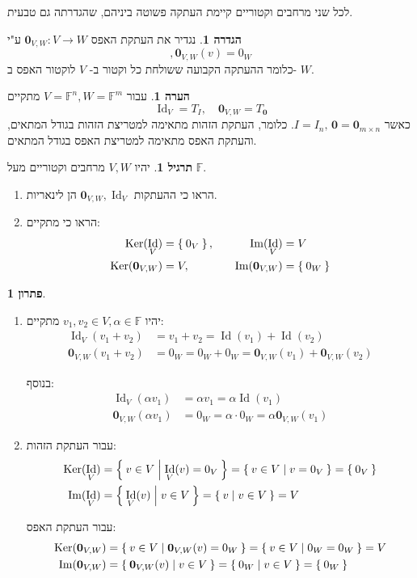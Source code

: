\documentclass[12pt]{report}
\theoremstyle{plain}
\theoremstyle{definition}
\newtheorem{definition}[theorem]{הגדרה}
\newtheorem{exercise}{תרגיל}[chapter]
\newtheorem{remark}{הערה}[chapter]
\newtheorem*{solution}{פתרון}
\newcommand{\F}{\mathbb{F}}
\newcommand{\0}{\mathbf{0}}
\DeclareMathOperator{\Ker}{Ker}
\DeclareMathOperator{\Image}{Im}
\DeclareMathOperator{\Id}{Id}
\begin{document}
לכל שני מרחבים וקטוריים קיימת העתקה פשוטה ביניהם, שהגדרתה גם טבעית.

\begin{definition}
\adddeftolist{העתקת האפס $\0_{V,W}$}
נגדיר את העתקת האפס
$\0_{V,W}:V\to W$
ע"י
$$
,\0_{V,W}(v)=0_W 
$$
כלומר ההעתקה הקבועה ששולחת כל וקטור ב-
$V$
לוקטור האפס ב-
$W$.
\end{definition}

\begin{remark}
עבור
$V=\F^n, W=\F^m$
מתקיים
$$
\Id_V=T_{I},\quad \0_{V,W}=T_{\0}
$$
כאשר
$I=I_n,\,\0=\0_{m\times n}$.
כלומר, העתקת הזהות מתאימה למטריצת הזהות בגודל המתאים, והעתקת האפס מתאימה למטריצת האפס בגודל המתאים.
\end{remark}

\begin{exercise}
יהיו
$V,W$
מרחבים וקטוריים מעל
$\F$.
\begin{enumerate}[label=\alph*.]
\item
הראו כי ההעתקות
$\0_{V,W},\Id_V$
הן לינאריות. 


\item
הראו כי מתקיים:
$$
\begin{aligned}
\Ker(\Id_V)      &= \Set{0_V},      & \quad \Image(\Id_V)      &= V \\
\Ker(\0_{V,W})   &= V,            & \quad \Image(\0_{V,W})   &= \Set{0_W}
\end{aligned}
$$
\end{enumerate}
\end{exercise}

\begin{solution}\
\begin{enumerate}[label=\alph*.]
\item 
יהיו 
$v_1,v_2\in V,\alpha\in\F$
מתקיים:
$$
\begin{aligned}
\Id_V(v_1+v_2)&=v_1+v_2=\Id(v_1)+\Id(v_2) \\
\0_{V,W}(v_1+v_2)&=0_W=0_W+0_W=\0_{V,W}(v_1)+\0_{V,W}(v_2)
\end{aligned}
$$

בנוסף:
$$
\begin{aligned}
\Id_V(\alpha v_1)&=\alpha v_1=\alpha\Id(v_1) \\
\0_{V,W}(\alpha v_1)&=0_W=\alpha\cdot 0_W=\alpha\0_{V,W}(v_1)
\end{aligned}
$$


\item
עבור העתקת הזהות:
$$
\begin{aligned}
\Ker(\Id_V)&=\Set{v\in V|\Id_V(v)=0_V}=\Set{v\in V|v=0_V}=\Set{0_V} \\
\Image(\Id_V)&=\Set{\Id_V(v)|v\in V}=\Set{v|v\in V}=V
\end{aligned}
$$

עבור העתקת האפס:
$$
\begin{aligned}
\Ker(\0_{V,W})&=\Set{v\in V|\0_{V,W}(v)=0_W}=\Set{v\in V|0_W=0_W}=V \\
\Image(\0_{V,W})&=\Set{\0_{V,W}(v)|v\in V}=\Set{0_W|v\in V}=\Set{0_W}
\end{aligned}
$$


\end{enumerate}
\end{solution}
\end{document}
